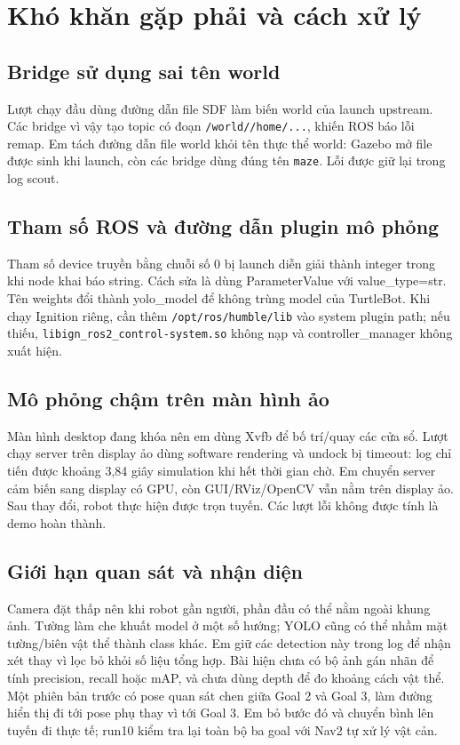 \documentclass[a4paper,11pt]{article}
\newcommand{\code}[1]{\nolinkurl{#1}}
\begin{document}
\section{Khó khăn gặp phải và cách xử lý}
\subsection{Bridge sử dụng sai tên world}

Lượt chạy đầu dùng đường dẫn file SDF làm biến world của launch upstream.
Các bridge vì vậy tạo topic có đoạn \code{/world//home/...}, khiến ROS báo lỗi remap.
Em tách đường dẫn file world khỏi tên thực thể world: Gazebo mở file được sinh khi
launch, còn các bridge dùng đúng tên \code{maze}. Lỗi được giữ lại trong log scout.

\subsection{Tham số ROS và đường dẫn plugin mô phỏng}

Tham số device truyền bằng chuỗi số 0 bị launch diễn giải thành integer trong khi
node khai báo string. Cách sửa là dùng ParameterValue với value\_type=str. Tên
weights đổi thành yolo\_model để không trùng model của TurtleBot. Khi chạy Ignition
riêng, cần thêm \code{/opt/ros/humble/lib} vào system plugin path; nếu thiếu,
\code{libign_ros2_control-system.so} không nạp và controller\_manager không xuất hiện.

\subsection{Mô phỏng chậm trên màn hình ảo}

Màn hình desktop đang khóa nên em dùng Xvfb để bố trí/quay các cửa sổ. Lượt chạy
server trên display ảo dùng software rendering và undock bị timeout: log chỉ tiến
được khoảng 3,84 giây simulation khi hết thời gian chờ. Em chuyển server cảm biến
sang display có GPU, còn GUI/RViz/OpenCV vẫn nằm trên display ảo. Sau thay đổi,
robot thực hiện được trọn tuyến. Các lượt lỗi không được tính là demo hoàn thành.

\subsection{Giới hạn quan sát và nhận diện}

Camera đặt thấp nên khi robot gần người, phần đầu có thể nằm ngoài khung ảnh.
Tường làm che khuất model ở một số hướng; YOLO cũng có thể nhầm mặt tường/biên
vật thể thành class khác. Em giữ các detection này trong log để nhận xét thay vì
lọc bỏ khỏi số liệu tổng hợp. Bài hiện chưa có bộ ảnh gán nhãn để tính precision,
recall hoặc mAP, và chưa dùng depth để đo khoảng cách vật thể.
Một phiên bản trước có pose quan sát chen giữa Goal 2 và Goal 3, làm đường hiển thị
đi tới pose phụ thay vì tới Goal 3. Em bỏ bước đó và chuyển bình lên tuyến đi thực tế;
run10 kiểm tra lại toàn bộ ba goal với Nav2 tự xử lý vật cản.
\end{document}
